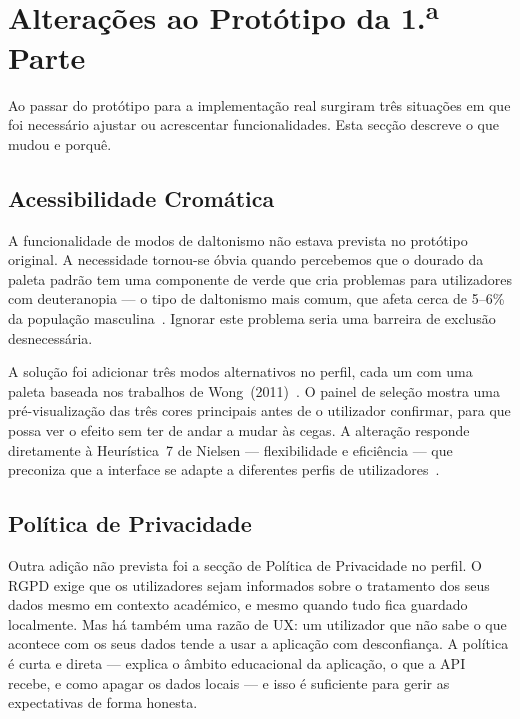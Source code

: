 \chapter{Alterações ao Protótipo da 1.\textsuperscript{a} Parte}
\label{chap:alteracoes}

Ao passar do protótipo para a implementação real surgiram três situações em que foi necessário ajustar ou acrescentar funcionalidades. Esta secção descreve o que mudou e porquê.

\section{Acessibilidade Cromática}
\label{chap5:sec:alt1}

A funcionalidade de modos de daltonismo não estava prevista no protótipo original. A necessidade tornou-se óbvia quando percebemos que o dourado da paleta padrão tem uma componente de verde que cria problemas para utilizadores com deuteranopia --- o tipo de daltonismo mais comum, que afeta cerca de 5--6\% da população masculina~\cite{birch2012}. Ignorar este problema seria uma barreira de exclusão desnecessária.

A solução foi adicionar três modos alternativos no perfil, cada um com uma paleta baseada nos trabalhos de Wong~(2011)~\cite{wong2011}. O painel de seleção mostra uma pré-visualização das três cores principais antes de o utilizador confirmar, para que possa ver o efeito sem ter de andar a mudar às cegas. A alteração responde diretamente à Heurística~7 de Nielsen --- flexibilidade e eficiência --- que preconiza que a interface se adapte a diferentes perfis de utilizadores~\cite{nielsen1994}.

\section{Política de Privacidade}
\label{chap5:sec:alt2}

Outra adição não prevista foi a secção de Política de Privacidade no perfil. O \ac{RGPD} exige que os utilizadores sejam informados sobre o tratamento dos seus dados mesmo em contexto académico, e mesmo quando tudo fica guardado localmente. Mas há também uma razão de \ac{UX}: um utilizador que não sabe o que acontece com os seus dados tende a usar a aplicação com desconfiança. A política é curta e direta --- explica o âmbito educacional da aplicação, o que a API recebe, e como apagar os dados locais --- e isso é suficiente para gerir as expectativas de forma honesta.

